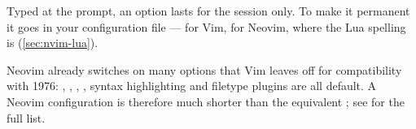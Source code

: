 Typed at the \key{:} prompt, an option lasts for the session only. To make it
permanent it goes in your configuration file --- 
for Vim,  for Neovim, where the Lua
spelling is  (\autoref{sec:nvim-lua}).

\begin{remark}
	Neovim already switches on many options that Vim leaves off for compatibility
	with 1976: , , ,
	, syntax highlighting and filetype plugins are all default.
	A Neovim configuration is therefore much shorter than the equivalent
	; see  for the full list.
\end{remark}
